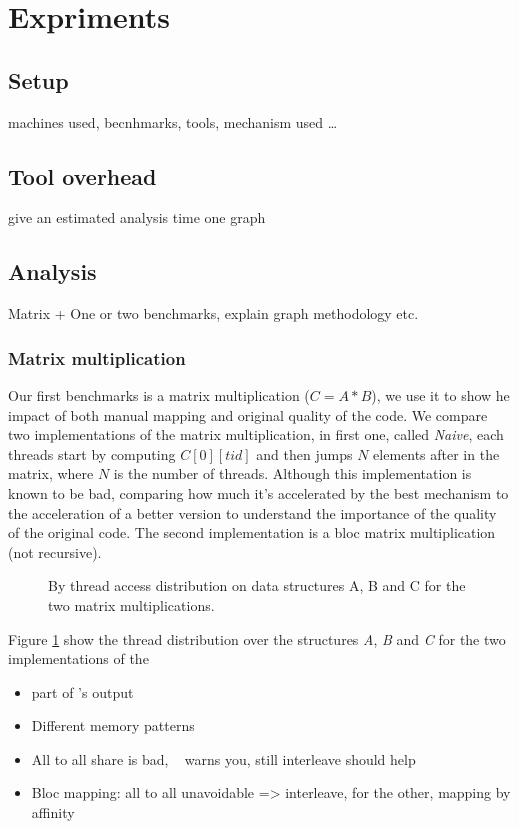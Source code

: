\section{Expriments}
\label{sec:expe}
\subsection{Setup}
\label{sec:expe-setup}
machines used, becnhmarks, tools, mechanism used \ldots
\subsection{Tool overhead}
\label{sec:expe-overhead}
give an estimated analysis time one graph
\subsection{Analysis}
\label{sec:expe-analysis}
Matrix + One or two benchmarks, explain graph methodology etc.
\subsubsection{Matrix multiplication}

Our first benchmarks is a matrix multiplication ($C=A*B$), we use it to show he
impact of both manual mapping and original quality of the code. We compare two
implementations of the matrix multiplication, in first one, called
\emph{Naive}, each threads start by computing $C[0][tid]$ and then jumps $N$
elements after in the matrix, where $N$ is the number of threads. Although
this implementation is known to be bad, comparing how much it's accelerated by
the best mechanism to the acceleration of a better version to understand the
importance of the quality of the original code.  The
second implementation is a bloc matrix multiplication (not recursive).

\begin{figure}[htb]
    \centering
    \caption{By thread access distribution on data structures A, B and C for
    the two matrix multiplications.}
    \label{fig:matrix-behaviour}
\end{figure}

Figure \ref{fig:matrix-behaviour} show the thread distribution over the
structures \emph{A}, \emph{B} and \emph{C} for the two implementations of the
\begin{itemize}
    \item part of \TABARNAC's output
    \item Different memory patterns
    \item All to all share is bad, \TABARNAC~ warns you, still interleave
        should help
    \item Bloc mapping: all to all unavoidable => interleave, for the other,
        mapping by affinity
\end{itemize}


